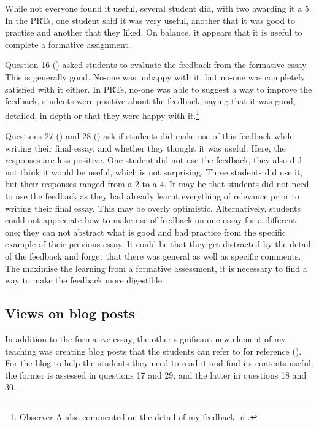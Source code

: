 While not everyone found it useful, several student did, with two awarding it a $5$. In the PRTs, one student said it was very useful, another that it was good to practise and another that they liked. On balance, it appears that it is useful to complete a formative assignment.

Question 16 () asked students to evaluate the feedback from the formative essay. This is generally good. No-one was unhappy with it, but no-one was completely satisfied with it either. In PRTs, no-one was able to suggest a way to improve the feedback, students were positive about the feedback, saying that it was good, detailed, in-depth or that they were happy with it.\footnote{Observer A also commented on the detail of my feedback in .}

Questions 27 () and 28 () ask if students did make use of this feedback while writing their final essay, and whether they thought it was useful. Here, the responses are less positive. One student did not use the feedback, they also did not think it would be useful, which is not surprising. Three students did use it, but their responses ranged from a $2$ to a $4$. It may be that students did not need to use the feedback as they had already learnt everything of relevance prior to writing their final essay. This may be overly optimistic. Alternatively, students could not appreciate how to make use of feedback on one essay for a different one; they can not abstract what is good and bad practice from the specific example of their previous essay. It could be that they get distracted by the detail of the feedback and forget that there was general as well as specific comments. The maximise the learning from a formative assessment, it is necessary to find a way to make the feedback more digestible.

\subsection{Views on blog posts}\label{sec:views-blog}

In addition to the formative essay, the other significant new element of my teaching was creating blog posts that the students can refer to for reference (). For the blog to help the students they need to read it and find its contents useful; the former is assessed in questions 17 and 29, and the latter in questions 18 and 30.

